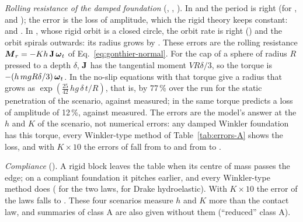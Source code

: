 \begin{table}[t]
\caption{Class A: error [\%] of each method, base variant (abbreviations in
Section~\ref{sec:variants}; methods of the library on Chrono). The columns of the native models
are results of our configurations (Section~S3). \textit{nan}, \textit{timeout}: runs without an
error value}
\label{tab:errors-A}
\end{table}

\emph{Rolling resistance of the damped foundation} (, , ).
In  and  the period is right (for ,
 and ); the error is
the loss of amplitude, which the rigid theory keeps constant:  and
. In , whose rigid orbit is a closed circle, the
orbit rate is right () and the orbit spirals
outwards: its radius grows by . These errors are the rolling
resistance $\boldsymbol{M}_r = -K h\,\mathbf{J}\,\boldsymbol{\omega}_t$ of Eq.~\eqref{eq:gonthier-normal}. For the cap of
a sphere of radius $R$ pressed to a depth $\delta$, $\mathbf{J}$ has the tangential moment
$V R\delta/3$, so the torque is $-(h\,m g R\delta/3)\,\boldsymbol{\omega}_t$. In  the no-slip
equations with that torque give a radius that grows as $\exp(\tfrac{25}{42}\,h g\,\delta\,t/R)$,
that is, by 77\,\% over the run for the static penetration of the scenario, against
 measured; in  the same torque predicts a loss of
amplitude of 12\,\%, against  measured.
The errors are the model's answer at the $h$ and $K$ of the scenario, not numerical errors: any
damped Winkler foundation has this torque, every Winkler-type method of
Table~\ref{tab:errors-A} shows the loss, and with
$K\times10$ the errors of  fall from 
to  and from  to
.

\emph{Compliance} (). A rigid block leaves the table when its centre of mass passes
the edge; on a compliant foundation it pitches earlier, and every Winkler-type method does
( for the two laws,  for Drake
hydroelastic). With $K\times10$ the error of the laws falls to
. These four scenarios measure $h$ and $K$ more than the
contact law, and summaries of class A are also given without them (``reduced'' class A).


